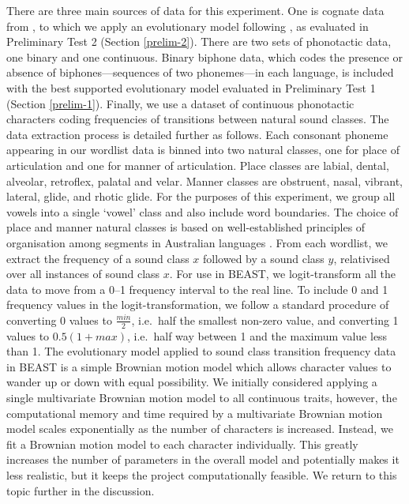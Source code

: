\documentclass[]{article}
\begin{document}
There are three main sources of data for this experiment. One is cognate data from \textcite{bouckaert_origin_2018}, to which we apply an evolutionary model following \textcite{bouckaert_origin_2018}, as evaluated in Preliminary Test 2 (Section \ref{prelim-2}). There are two sets of phonotactic data, one binary and one continuous. Binary biphone data, which codes the presence or absence of biphones---sequences of two phonemes---in each language, is included with the best supported evolutionary model evaluated in Preliminary Test 1 (Section \ref{prelim-1}). Finally, we use a dataset of continuous phonotactic characters coding frequencies of transitions between natural sound classes. The data extraction process is detailed further as follows. Each consonant phoneme appearing in our wordlist data is binned into two natural classes, one for place of articulation and one for manner of articulation. Place classes are labial, dental, alveolar, retroflex, palatal and velar. Manner classes are obstruent, nasal, vibrant, lateral, glide, and rhotic glide. For the purposes of this experiment, we group all vowels into a single `vowel' class and also include word boundaries. The choice of place and manner natural classes is based on well-established principles of organisation among segments in Australian languages \autocites{dixon_languages_1980}{hamilton_phonetic_1996}{baker_word_2014}{round_segment_2021}{round_phonotactics_2021}. From each wordlist, we extract the frequency of a sound class \(x\) followed by a sound class \(y\), relativised over all instances of sound class \(x\). For use in BEAST, we logit-transform all the data to move from a 0--1 frequency interval to the real line. To include 0 and 1 frequency values in the logit-transformation, we follow a standard procedure of converting 0 values to \(\frac{min}{2}\), i.e.~half the smallest non-zero value, and converting 1 values to \(0.5 (1 + max)\), i.e.~half way between 1 and the maximum value less than 1. The evolutionary model applied to sound class transition frequency data in BEAST is a simple Brownian motion model which allows character values to wander up or down with equal possibility. We initially considered applying a single multivariate Brownian motion model to all continuous traits, however, the computational memory and time required by a multivariate Brownian motion model scales exponentially as the number of characters is increased. Instead, we fit a Brownian motion model to each character individually. This greatly increases the number of parameters in the overall model and potentially makes it less realistic, but it keeps the project computationally feasible. We return to this topic further in the discussion.
\end{document}
